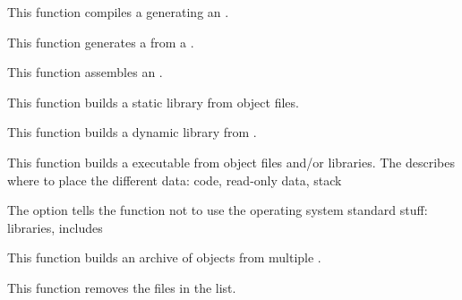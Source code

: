          {
	   This function compiles a  generating an
	   .
	 }

         {
	   This function generates a  from a
	   .
	 }

         {
	   This function assembles an .
	 }

         {
	   This function builds a static library from object files.
	 }

         {
	   This function builds a dynamic library from .
	 }

         {
	   This function builds a executable from object files and/or
	   libraries. The  describes where to
	   place the different data: code, read-only data, stack \etc{}

	   \-

	   The option  tells the function
	   not to use the operating system standard stuff: libraries, includes
	   \etc{}
	 }

         {
	   This function builds an archive of objects from multiple
	   .
	 }

         {
	   This function removes the files in the list.
	 }

